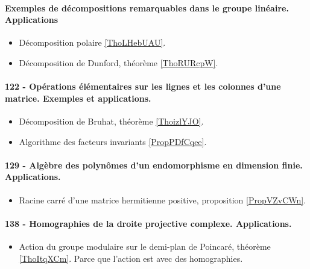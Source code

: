 \paragraph{Exemples de décompositions remarquables dans le groupe linéaire. Applications}
\begin{itemize}
    \item Décomposition polaire \ref{ThoLHebUAU}.
    \item Décomposition de Dunford, théorème \ref{ThoRURcpW}. 
\end{itemize}

\paragraph{122 - Opérations élémentaires sur les lignes et les colonnes d’une matrice. Exemples et applications.}
\begin{itemize}
    \item Décomposition de Bruhat, théorème \ref{ThoizlYJO}.
    \item Algorithme des facteurs invariants \ref{PropPDfCqee}.
\end{itemize}
\paragraph{129 - Algèbre des polynômes d'un endomorphisme en dimension finie. Applications.}
\begin{itemize}
    \item Racine carré d'une matrice hermitienne positive, proposition \ref{PropVZvCWn}.
\end{itemize}
\paragraph{138 - Homographies de la droite projective complexe. Applications.}
\begin{itemize}
    \item Action du groupe modulaire sur le demi-plan de Poincaré, théorème \ref{ThoItqXCm}. Parce que l'action est avec des homographies.
\end{itemize}
